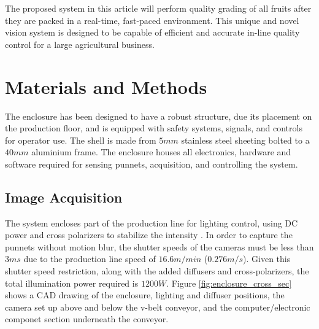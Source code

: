 \documentclass[conference]{IEEEtran}
\begin{document}
The proposed system in this article will perform quality grading of all fruits after they are packed in a real-time, fast-paced environment. This unique and novel vision system is designed to be capable of efficient and accurate in-line quality control for a large agricultural business.   

 



\section{Materials and Methods}
 

The enclosure has been designed to have a robust structure, due its placement on the production floor, and is equipped with safety systems, signals, and controls for operator use. The shell is made from $5mm$ stainless steel sheeting bolted to a $40mm$ aluminium frame. The enclosure houses all electronics, hardware and software required for sensing punnets, acquisition, and controlling the system.




\subsection{Image Acquisition} 


The system encloses part of the production line for lighting control, using DC power and cross polarizers to stabilize the intensity \cite{eaton}. In order to capture the punnets without motion blur, the shutter speeds of the cameras must be less than $3ms$ due to the production line speed of $16.6m/min$ ($0.276m/s$). Given this shutter speed restriction, along with the added diffusers and cross-polarizers, the total illumination power required is $1200W$. Figure \ref{fig:enclosure_cross_sec} shows a CAD drawing of the enclosure, lighting and diffuser positions, the camera set up above and below the v-belt conveyor, and the computer/electronic componet section underneath the conveyor.
\end{document}
